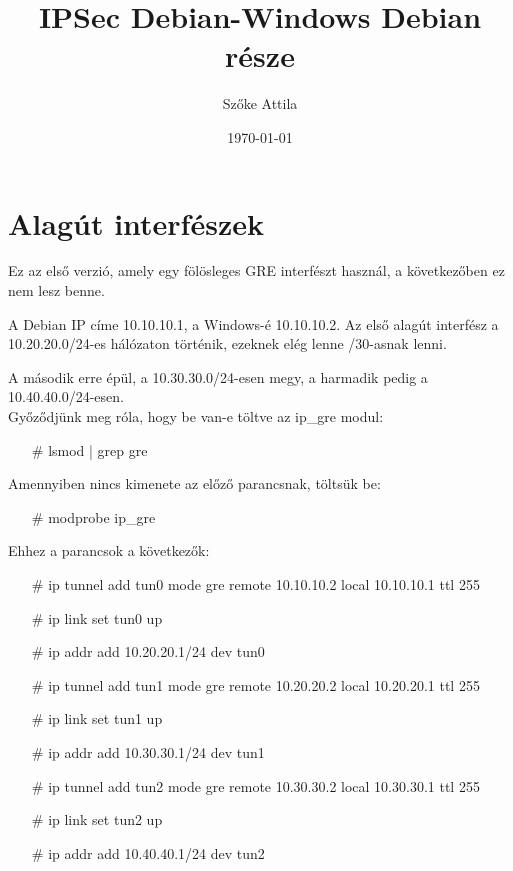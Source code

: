 \documentclass{article} %
\title{IPSec Debian-Windows Debian része} %
\author{Szőke Attila} %
\date{\today} %
\begin{document}
    \maketitle %


\vspace{5mm}
    \section*{Alagút interfészek} %

    Ez az első verzió, amely egy fölösleges GRE interfészt használ, a következőben ez nem lesz benne.
    
    A Debian IP címe 10.10.10.1, a Windows-é 10.10.10.2. Az első alagút interfész a 10.20.20.0/24-es hálózaton történik, ezeknek elég lenne /30-asnak lenni.
    
    A második erre épül, a 10.30.30.0/24-esen megy, a harmadik pedig a 10.40.40.0/24-esen. \\

    Győződjünk meg róla, hogy be van-e töltve az ip\_gre modul:

    \begin{itemize}
	    \item[\#] lsmod | grep gre
    \end{itemize}

    Amennyiben nincs kimenete az előző parancsnak, töltsük be:

    \begin{itemize}
	    \item[\#] modprobe ip\_gre
    \end{itemize}

    Ehhez a parancsok a következők:
    \begin{itemize}
	    \item[\#] ip tunnel add tun0 mode gre remote 10.10.10.2 local 10.10.10.1 ttl 255
	    \item[\#] ip link set tun0 up
	    \item[\#] ip addr add 10.20.20.1/24 dev tun0
	    \item[\#] ip tunnel add tun1 mode gre remote 10.20.20.2 local 10.20.20.1 ttl 255
	    \item[\#] ip link set tun1 up
	    \item[\#] ip addr add 10.30.30.1/24 dev tun1
	    \item[\#] ip tunnel add tun2 mode gre remote 10.30.30.2 local 10.30.30.1 ttl 255
	    \item[\#] ip link set tun2 up
	    \item[\#] ip addr add 10.40.40.1/24 dev tun2
\end{itemize}
\end{document}
